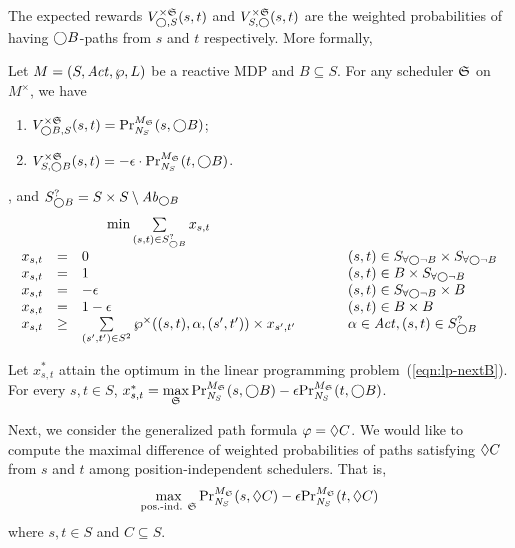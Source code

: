 The expected rewards ${V}_{\gX, S}^{\times\scheduler{S}} (s, t)$ and
${V}_{S, \gX}^{\times\scheduler{S}} (s, t)$ are the weighted
probabilities of having $\gX B$-paths from $s$ and $t$
respectively. More formally,
\begin{proposition}
  \label{proposition:joint-probabilities}
  Let $M = (S, \Act, \wp, L)$ be a reactive MDP and $B \subseteq S$.
  For any scheduler $\scheduler{S}$ on $M^{\times}$, we have
  \begin{enumerate}
  \item ${V}_{\gX B, S}^{\times\scheduler{S}} (s, t) =
    \myPr{s}{M_{\scheduler{S}}}{\neighbor{S}}{\gX B}$;
  \item ${V}_{S, \gX B}^{\times\scheduler{S}} (s, t) =
    -\epsilon \cdot \myPr{t}{M_{\scheduler{S}}}{\neighbor{S}}{\gX B}$.
  \end{enumerate}
\end{proposition}

, and $S^{?}_{\gX B} = S
\times S \setminus \mathit{Ab}_{\gX B}$
\begin{eqnarray}
  \label{eqn:lp-nextB}
\begin{array}{rclll}
  \multicolumn{3}{c}{
  \min \sum\limits_{(s, t) \in {S}^{?}_{\gX B}} x_{s, t}
  }\\
  x_{s, t} & = & 0 & \hspace{.05\columnwidth} &
  (s, t) \in \nevernextB \times \nevernextB \\
  x_{s, t} & = & 1 &&
  (s, t) \in B \times \nevernextB\\
  x_{s, t} & = & - \epsilon &&
  (s, t) \in \nevernextB \times B\\
  x_{s, t} & = & 1 - \epsilon &&
  (s, t) \in B \times B\\
  x_{s, t} &\geq&
  \sum\limits_{(s', t') \in {S}^{2}}
   \wp^{\times} ((s, t), \alpha, (s', t')) \times x_{s', t'}
  &&
  \alpha \in \Act, (s, t) \in {S}^{?}_{\gX B}
\end{array}
\end{eqnarray}

\begin{theorem}
  Let $x^*_{s, t}$ attain the optimum in the linear programming
  problem~(\ref{eqn:lp-nextB}). For every $s, t \in S$,
  $x^*_{s, t} = \max\limits_{\scheduler{S}}
  \myPr{s}{M_{\scheduler{S}}}{\neighbor{S}}{\gX B} -
  \epsilon \myPr{t}{M_{\scheduler{S}}}{\neighbor{S}}{\gX B}$.
  \label{theorem:nextC}
\end{theorem}

Next, we consider the generalized path formula $\varphi = \gF C$. We
would like to compute the maximal difference of weighted probabilities
of paths satisfying $\gF C$ from $s$ and $t$ among
position-independent schedulers. That is,
\begin{eqnarray}
  \label{eqn:max-eventuallyC}
\max_{\textmd{pos.-ind. } \scheduler{S}}
\myPr{s}{M_{\scheduler{S}}}{\neighbor{S}}{\gF C} -
\epsilon \myPr{t}{M_{\scheduler{S}}}{\neighbor{S}}{\gF C}
\end{eqnarray}
where $s, t \in S$ and $C \subseteq S$.

